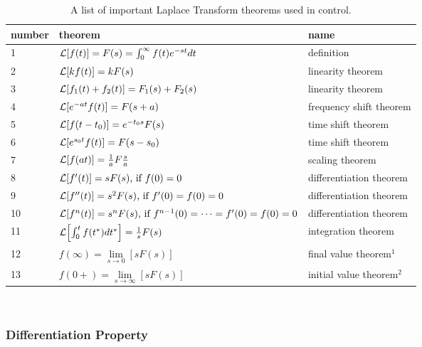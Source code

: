 \documentclass[12pt,letter]{article}
\begin{document}
\begin{table}[H]
\centering
\caption{A list of important Laplace Transform theorems used in control.}
\label{table:laplace_theorems}
\begin{tabular}{@{}lll@{}}
\toprule
number & theorem & name \\ \midrule
1 & $ 	\mathcal{L}{\left[f(t)\right]} = F(s) = \int_{0}^{\infty} f(t)e^{-st}dt$ & definition \\
2 & $ 	\mathcal{L}{\left[kf(t)\right]} = kF(s) $ & linearity theorem \\
3 & $ \mathcal{L}{\left[f_1(t)+f_2(t)\right]} = F_1(s) + F_2(s) $ & linearity theorem \\
4 & $ \mathcal{L}{\left[e^{-at}f(t)\right]} = F(s+a)$ & frequency shift theorem \\
5 & $ \mathcal{L}{\left[f(t-t_0)\right]} = e^{-t_0s}F(s) $ & time shift theorem \\
6 & $ \mathcal{L}{\left[e^{s_0t}f(t)\right]} = F(s-s_0)$ & time shift theorem \\
7 & $ \mathcal{L}{\left[f(at)\right]} = \frac{1}{a}F \frac{s}{a} $ & scaling theorem \\
8 & $\mathcal{L}{\left[f'(t)\right]} = sF(s) \text{, if } f(0) = 0   $ & differentiation theorem \\
9 & $ \mathcal{L}{\left[f''(t)\right]} = s^2F(s) \text{, if } f'(0) = f(0) = 0  $ & differentiation theorem \\
10 & $ \mathcal{L}{\left[f^{n}(t)\right]} = s^{n}F(s) \text{, if } f^{n-1}(0) = \cdots = f'(0) = f(0) = 0 $ & differentiation theorem \\
11 & $ \mathcal{L}{\left[\int_{0}^{t}f(t^*)dt^*\right]} = \frac{1}{s}F(s) $ & integration theorem\\
12 & $ f(\infty)  = \lim\limits_{s\rightarrow 0} [s F(s)] $ & final value theorem$^1$ \\
13 & $ f(0+)  = \lim\limits_{s\rightarrow \infty} [s F(s)] $ & initial value theorem$^2$ \\ \bottomrule
\end{tabular}
\end{table}
\vspace{-2ex}
 \\




\subsubsection{Differentiation Property}
\end{document}
